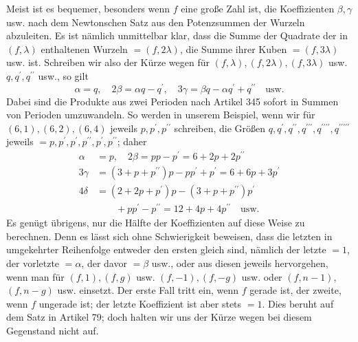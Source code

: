 Meist ist es bequemer, besonders wenn \(f\) eine große Zahl ist, die Koeffizienten \(\beta,\allowbreak \gamma\) usw. nach dem Newtonschen Satz aus den Potenzsummen der Wurzeln abzuleiten. Es ist nämlich unmittelbar klar, dass die Summe der Quadrate der in \((f,\lambda)\) enthaltenen Wurzeln \(=(f,2\lambda)\), die Summe ihrer Kuben \(=(f,3\lambda)\) usw. ist. Schreiben wir also der Kürze wegen für \((f,\lambda),\allowbreak (f,2\lambda),\allowbreak (f,3\lambda)\) usw. \(q,\allowbreak q^{\prime},\allowbreak q^{\prime\prime}\) usw., so gilt \[\alpha=q,\quad 2\beta=\alpha q-q^{\prime},\quad 3\gamma=\beta q-\alpha q^{\prime}+q^{\prime\prime}\quad\text{usw.}\] Dabei sind die Produkte aus zwei Perioden nach Artikel 345 sofort in Summen von Perioden umzuwandeln. So werden in unserem Beispiel, wenn wir für \((6,1),\allowbreak (6,2),\allowbreak (6,4)\) jeweils \(p,\allowbreak p^{\prime},\allowbreak p^{\prime\prime}\) schreiben, die Größen \(q,\allowbreak q^{\prime},\allowbreak q^{\prime\prime},\allowbreak q^{\prime\prime\prime},\allowbreak q^{\prime\prime\prime\prime},\allowbreak q^{\prime\prime\prime\prime\prime}\) jeweils \(=p,\allowbreak p^{\prime},\allowbreak p^{\prime},\allowbreak p^{\prime\prime},\allowbreak p^{\prime},\allowbreak p^{\prime\prime}\); daher \[\begin{aligned}
\alpha&=p,\quad2\beta=pp-p^{\prime}=6+2p+2p^{\prime\prime}\\
3\gamma&=(3+p+p^{\prime\prime})p-pp^{\prime}+p^{\prime}=6+6p+3p^{\prime}\\
4\delta&=(2+2p+p^{\prime})p-(3+p+p^{\prime\prime})p^{\prime}\\
&\qquad+pp^{\prime}-p^{\prime\prime}=12+4p+4p^{\prime\prime}\quad\mathrm{usw.}
\end{aligned}\] Es genügt übrigens, nur die Hälfte der Koeffizienten auf diese Weise zu berechnen. Denn es lässt sich ohne Schwierigkeit beweisen, dass die letzten in umgekehrter Reihenfolge entweder den ersten gleich sind, nämlich der letzte \(=1\), der vorletzte \(=\alpha\), der davor \(=\beta\) usw., oder aus diesen jeweils hervorgehen, wenn man für \((f,1),\allowbreak (f,g)\) usw. \((f,-1),\allowbreak (f,-g)\) usw. oder \((f,n-1)\), \((f,n-g)\) usw. einsetzt. Der erste Fall tritt ein, wenn \(f\) gerade ist, der zweite, wenn \(f\) ungerade ist; der letzte Koeffizient ist aber stets \(=1\). Dies beruht auf dem Satz in Artikel 79; doch halten wir uns der Kürze wegen bei diesem Gegenstand nicht auf.

